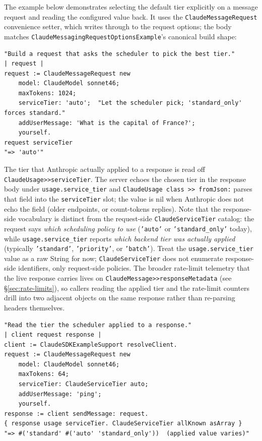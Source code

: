 \documentclass[a4paper,10pt,fleqn]{article}
\begin{document}
The example below demonstrates selecting the default tier
explicitly on a message request and reading the configured value
back.  It uses the \texttt{ClaudeMessageRequest} convenience setter,
which writes through to the request options; the body matches
\texttt{ClaudeMessagingRequestOptionsExample}'s canonical build
shape:

\begin{lstlisting}[language={}]
"Build a request that asks the scheduler to pick the best tier."
| request |
request := ClaudeMessageRequest new
    model: ClaudeModel sonnet46;
    maxTokens: 1024;
    serviceTier: 'auto';  "Let the scheduler pick; 'standard_only' forces standard."
    addUserMessage: 'What is the capital of France?';
    yourself.
request serviceTier
"=> 'auto'"
\end{lstlisting}

The tier that Anthropic actually applied to a response is read off
\texttt{ClaudeUsage>>serviceTier}.  The server echoes the chosen
tier in the response body under \texttt{usage.service\_tier} and
\texttt{ClaudeUsage class >> fromJson:} parses that field into the
\texttt{serviceTier} slot; the value is nil when Anthropic does not
echo the field (older endpoints, or count-tokens replies).  Note
that the response-side vocabulary is distinct from the request-side
\texttt{ClaudeServiceTier} catalog: the request says \emph{which
scheduling policy to use} (\texttt{'auto'} or \texttt{'standard\_only'}
today), while \texttt{usage.service\_tier} reports \emph{which
backend tier was actually applied} (typically \texttt{'standard'},
\texttt{'priority'}, or \texttt{'batch'}).  Treat the
\texttt{usage.service\_tier} value as a raw String for now;
\texttt{ClaudeServiceTier} does not enumerate response-side
identifiers, only request-side policies.  The
broader rate-limit telemetry that the live response carries lives
on \texttt{ClaudeMessage>>responseMetadata} (see
\S\ref{sec:rate-limits}), so callers reading the applied tier and
the rate-limit counters drill into two adjacent objects on the same
response rather than re-parsing headers themselves.

\begin{lstlisting}[language={}]
"Read the tier the scheduler applied to a response."
| client request response |
client := ClaudeSDKExampleSupport resolveClient.
request := ClaudeMessageRequest new
    model: ClaudeModel sonnet46;
    maxTokens: 64;
    serviceTier: ClaudeServiceTier auto;
    addUserMessage: 'ping';
    yourself.
response := client sendMessage: request.
{ response usage serviceTier. ClaudeServiceTier allKnown asArray }
"=> #('standard' #('auto' 'standard_only'))  (applied value varies)"
\end{lstlisting}
\end{document}

